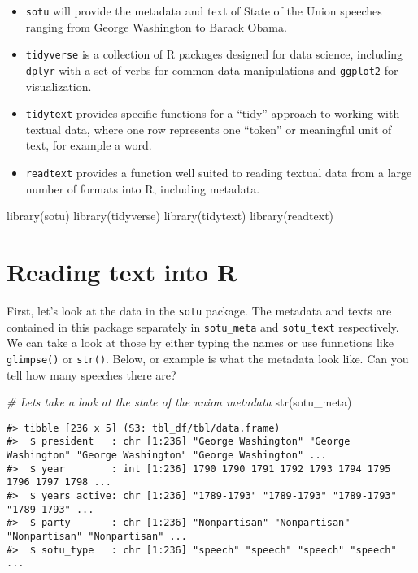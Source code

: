 \documentclass[
]{book}
\newenvironment{Shaded}{\begin{snugshade}}{\end{snugshade}}
\newcommand{\CommentTok}[1]{\textcolor[rgb]{0.56,0.35,0.01}{\textit{#1}}}
\newcommand{\FunctionTok}[1]{\textcolor[rgb]{0.00,0.00,0.00}{#1}}
\newcommand{\NormalTok}[1]{#1}
\providecommand{\tightlist}{%
  \setlength{\itemsep}{0pt}\setlength{\parskip}{0pt}}
\begin{document}
\begin{itemize}
\tightlist
\item
  \texttt{sotu} will provide the metadata and text of State of the Union speeches ranging from George Washington to Barack Obama.
\item
  \texttt{tidyverse} is a collection of R packages designed for data science, including \texttt{dplyr} with a set of verbs for common data manipulations and \texttt{ggplot2} for visualization.
\item
  \texttt{tidytext} provides specific functions for a ``tidy'' approach to working with textual data, where one row represents one ``token'' or meaningful unit of text, for example a word.
\item
  \texttt{readtext} provides a function well suited to reading textual data from a large number of formats into R, including metadata.
\end{itemize}

\begin{Shaded}
\begin{Highlighting}[]
\FunctionTok{library}\NormalTok{(sotu)}
\FunctionTok{library}\NormalTok{(tidyverse)}
\FunctionTok{library}\NormalTok{(tidytext)}
\FunctionTok{library}\NormalTok{(readtext)}
\end{Highlighting}
\end{Shaded}

\hypertarget{reading-text-into-r}{%
\section{Reading text into R}\label{reading-text-into-r}}

First, let's look at the data in the \texttt{sotu} package. The metadata and texts are contained in this package separately in \texttt{sotu\_meta} and \texttt{sotu\_text} respectively. We can take a look at those by either typing the names or use funnctions like \texttt{glimpse()} or \texttt{str()}. Below, or example is what the metadata look like. Can you tell how many speeches there are?

\begin{Shaded}
\begin{Highlighting}[]
\CommentTok{\# Let\textquotesingle{}s take a look at the state of the union metadata}
\FunctionTok{str}\NormalTok{(sotu\_meta)}
\end{Highlighting}
\end{Shaded}

\begin{verbatim}
#> tibble [236 x 5] (S3: tbl_df/tbl/data.frame)
#>  $ president   : chr [1:236] "George Washington" "George Washington" "George Washington" "George Washington" ...
#>  $ year        : int [1:236] 1790 1790 1791 1792 1793 1794 1795 1796 1797 1798 ...
#>  $ years_active: chr [1:236] "1789-1793" "1789-1793" "1789-1793" "1789-1793" ...
#>  $ party       : chr [1:236] "Nonpartisan" "Nonpartisan" "Nonpartisan" "Nonpartisan" ...
#>  $ sotu_type   : chr [1:236] "speech" "speech" "speech" "speech" ...
\end{verbatim}
\end{document}
